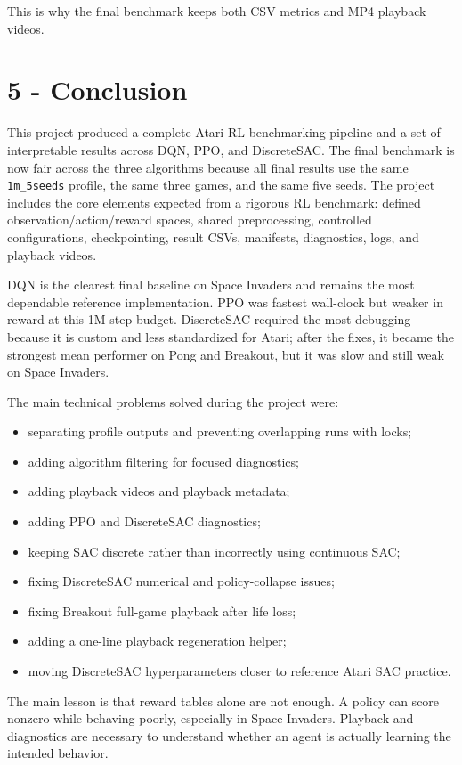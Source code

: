 \documentclass[11pt]{article}
\begin{document}
This is why the final benchmark keeps both CSV metrics and MP4 playback videos.

\section*{5 - Conclusion}

This project produced a complete Atari RL benchmarking pipeline and a set of interpretable results across DQN, PPO, and DiscreteSAC. The final benchmark is now fair across the three algorithms because all final results use the same \texttt{1m\_5seeds} profile, the same three games, and the same five seeds. The project includes the core elements expected from a rigorous RL benchmark: defined observation/action/reward spaces, shared preprocessing, controlled configurations, checkpointing, result CSVs, manifests, diagnostics, logs, and playback videos.

DQN is the clearest final baseline on Space Invaders and remains the most dependable reference implementation. PPO was fastest wall-clock but weaker in reward at this 1M-step budget. DiscreteSAC required the most debugging because it is custom and less standardized for Atari; after the fixes, it became the strongest mean performer on Pong and Breakout, but it was slow and still weak on Space Invaders.

The main technical problems solved during the project were:

\begin{itemize}
\item separating profile outputs and preventing overlapping runs with locks;
\item adding algorithm filtering for focused diagnostics;
\item adding playback videos and playback metadata;
\item adding PPO and DiscreteSAC diagnostics;
\item keeping SAC discrete rather than incorrectly using continuous SAC;
\item fixing DiscreteSAC numerical and policy-collapse issues;
\item fixing Breakout full-game playback after life loss;
\item adding a one-line playback regeneration helper;
\item moving DiscreteSAC hyperparameters closer to reference Atari SAC practice.
\end{itemize}

The main lesson is that reward tables alone are not enough. A policy can score nonzero while behaving poorly, especially in Space Invaders. Playback and diagnostics are necessary to understand whether an agent is actually learning the intended behavior.
\end{document}
